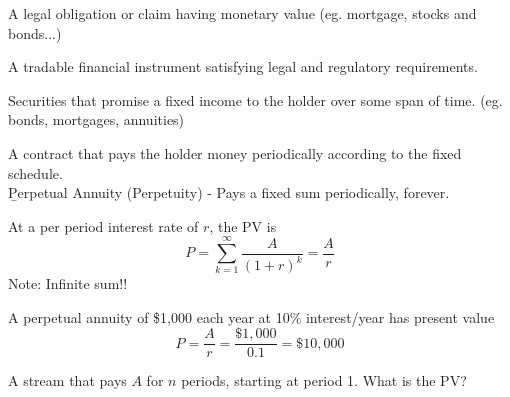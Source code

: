 

\begin{definition}
    A legal obligation or claim having monetary value (eg. mortgage, stocks and bonds...)
\end{definition}
\begin{definition}[Security]
    A tradable financial instrument satisfying legal and regulatory requirements.
\end{definition}
\begin{definition}
    Securities that promise a fixed income to the holder over some span of time. (eg. bonds, mortgages, annuities)
\end{definition}

A contract that pays the holder money periodically according to the fixed schedule.
\\\b{Perpetual Annuity (Perpetuity)} - Pays a fixed sum periodically, forever.

\begin{center}
\end{center}

At a per period interest rate of $r$, the PV is
\[P = \sum_{k=1}^{\infty}\frac{A}{(1+r)^k} = \frac{A}{r}\]
Note: Infinite sum!!

\begin{example}
    A perpetual annuity of \$1,000 each year at 10\% interest/year has present value
    \[P = \frac{A}{r} = \frac{\$1,000}{0.1} = \$10,000\]
\end{example}


A stream that pays $A$ for $n$ periods, starting at period 1. What is the PV?

\begin{center}
\end{center}

